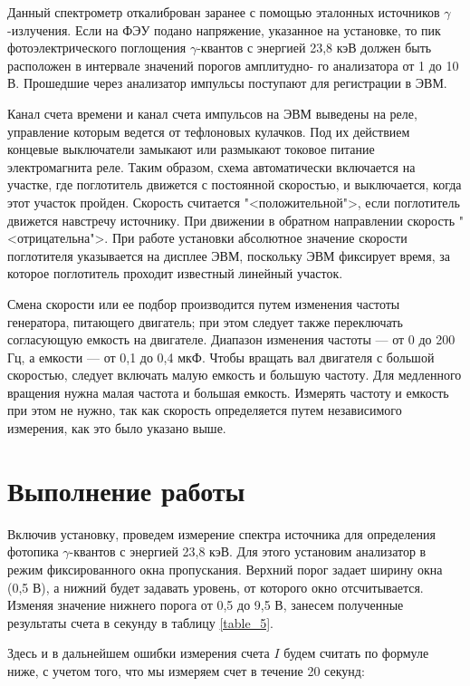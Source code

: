 \documentclass[12pt]{kiarticle}
\begin{document}
	Данный спектрометр откалиброван заранее с помощью эталонных
	источников $ \gamma $-излучения. Если на ФЭУ подано напряжение, указанное на установке, то пик фотоэлектрического поглощения $ \gamma $-квантов с энергией 23,8 кэВ
	должен быть расположен в интервале значений порогов амплитудно-
	го анализатора от 1 до 10 В. Прошедшие через анализатор импульсы
	поступают для регистрации в ЭВМ.
	
	Канал счета времени и канал счета импульсов на ЭВМ выведены
	на реле, управление которым ведется от тефлоновых кулачков. Под их
	действием концевые выключатели замыкают или размыкают токовое
	питание электромагнита реле. Таким образом, схема автоматически
	включается на участке, где поглотитель движется с постоянной скоростью, и выключается, когда этот участок пройден. Скорость считается "<положительной">, если поглотитель движется навстречу источнику.
	При движении в обратном направлении скорость "<отрицательна">. При
	работе установки абсолютное значение скорости поглотителя указывается на дисплее ЭВМ, поскольку ЭВМ фиксирует время, за которое
	поглотитель проходит известный линейный участок.
	
	Смена скорости или ее подбор производится путем изменения частоты генератора, питающего двигатель; при этом следует также переключать согласующую емкость на двигателе. Диапазон изменения
	частоты --- от 0 до 200 Гц, а емкости --- от 0,1 до 0,4 мкФ. Чтобы вращать вал двигателя с большой скоростью, следует включать малую
	емкость и большую частоту. Для медленного вращения нужна малая
	частота и большая емкость. Измерять частоту и емкость при этом не нужно, так как скорость определяется путем независимого измерения,
	как это было указано выше.

	
	\section{Выполнение работы}
	
	Включив установку, проведем измерение спектра источника для определения фотопика $ \gamma $-квантов с энергией 23,8 кэВ. Для этого установим анализатор в режим фиксированного окна пропускания. Верхний порог задает ширину окна (0,5 В), а нижний будет задавать уровень, от которого окно отсчитывается. Изменяя значение нижнего порога от 0,5 до 9,5 В, занесем полученные результаты счета в секунду в таблицу \ref{table_5}. 
	
	Здесь и в дальнейшем ошибки измерения счета $ I $ будем считать по формуле ниже, с учетом того, что мы измеряем счет в течение 20 секунд:
	
\end{document}
